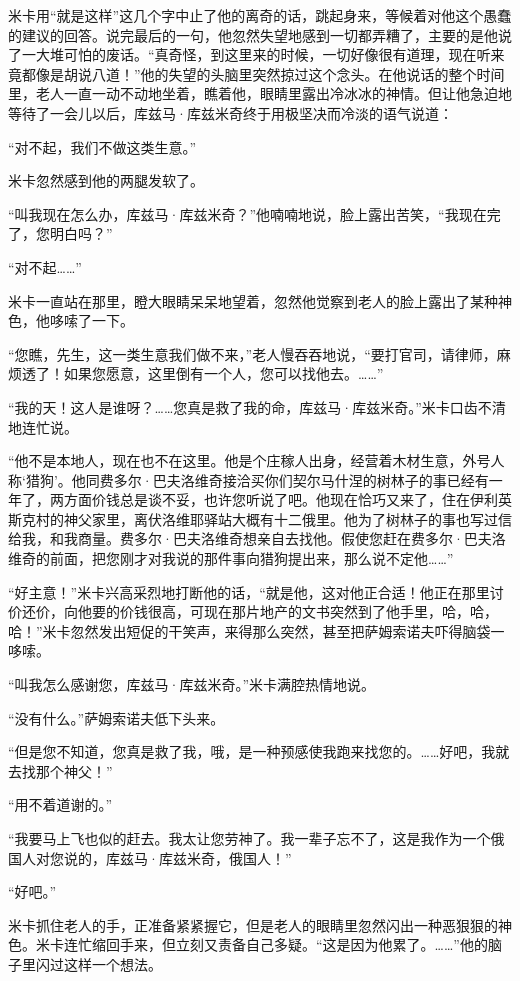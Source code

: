 \par 米卡用“就是这样”这几个字中止了他的离奇的话，跳起身来，等候着对他这个愚蠢的建议的回答。说完最后的一句，他忽然失望地感到一切都弄糟了，主要的是他说了一大堆可怕的废话。“真奇怪，到这里来的时候，一切好像很有道理，现在听来竟都像是胡说八道！”他的失望的头脑里突然掠过这个念头。在他说话的整个时间里，老人一直一动不动地坐着，瞧着他，眼睛里露出冷冰冰的神情。但让他急迫地等待了一会儿以后，库兹马·库兹米奇终于用极坚决而冷淡的语气说道：
\par “对不起，我们不做这类生意。”
\par 米卡忽然感到他的两腿发软了。
\par “叫我现在怎么办，库兹马·库兹米奇？”他喃喃地说，脸上露出苦笑，“我现在完了，您明白吗？”
\par “对不起……”
\par 米卡一直站在那里，瞪大眼睛呆呆地望着，忽然他觉察到老人的脸上露出了某种神色，他哆嗦了一下。
\par “您瞧，先生，这一类生意我们做不来，”老人慢吞吞地说，“要打官司，请律师，麻烦透了！如果您愿意，这里倒有一个人，您可以找他去。……”
\par “我的天！这人是谁呀？……您真是救了我的命，库兹马·库兹米奇。”米卡口齿不清地连忙说。
\par “他不是本地人，现在也不在这里。他是个庄稼人出身，经营着木材生意，外号人称‘猎狗’。他同费多尔·巴夫洛维奇接洽买你们契尔马什涅的树林子的事已经有一年了，两方面价钱总是谈不妥，也许您听说了吧。他现在恰巧又来了，住在伊利英斯克村的神父家里，离伏洛维耶驿站大概有十二俄里。他为了树林子的事也写过信给我，和我商量。费多尔·巴夫洛维奇想亲自去找他。假使您赶在费多尔·巴夫洛维奇的前面，把您刚才对我说的那件事向猎狗提出来，那么说不定他……”
\par “好主意！”米卡兴高采烈地打断他的话，“就是他，这对他正合适！他正在那里讨价还价，向他要的价钱很高，可现在那片地产的文书突然到了他手里，哈，哈，哈！”米卡忽然发出短促的干笑声，来得那么突然，甚至把萨姆索诺夫吓得脑袋一哆嗦。
\par “叫我怎么感谢您，库兹马·库兹米奇。”米卡满腔热情地说。
\par “没有什么。”萨姆索诺夫低下头来。
\par “但是您不知道，您真是救了我，哦，是一种预感使我跑来找您的。……好吧，我就去找那个神父！”
\par “用不着道谢的。”
\par “我要马上飞也似的赶去。我太让您劳神了。我一辈子忘不了，这是我作为一个俄国人对您说的，库兹马·库兹米奇，俄国人！”
\par “好吧。”
\par 米卡抓住老人的手，正准备紧紧握它，但是老人的眼睛里忽然闪出一种恶狠狠的神色。米卡连忙缩回手来，但立刻又责备自己多疑。“这是因为他累了。……”他的脑子里闪过这样一个想法。
